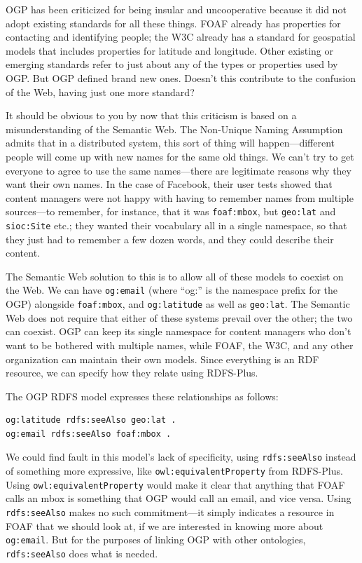 OGP has been criticized for being insular and uncooperative because it
did not adopt existing
standards for all these things. FOAF already has properties for
contacting and identifying people; the W3C already has a standard for
geospatial models that includes properties for latitude and longitude.
Other existing or emerging standards refer to just about any of the
types or properties used by OGP. But OGP defined brand new ones. Doesn't
this contribute to the confusion of the Web, having just one more
standard?

It should be obvious to you by now that this criticism is based on a
misunderstanding of the Semantic Web. The Non-Unique Naming Assumption
admits that in a distributed system, this sort of thing will
happen---different people will come up with new names for the same old
things. We can't try to get everyone to agree to use the same
names---there are legitimate reasons why they want their own names. In
the case of Facebook, their user tests showed that content managers were
not happy with having to remember names from multiple sources---to
remember, for instance, that it was \texttt{foaf:mbox}, but \texttt{geo:lat} and \texttt{sioc:Site}
etc.; they wanted their vocabulary all in a single namespace, so that
they just had to remember a few dozen words, and they could describe
their content.

The Semantic Web solution to this is to allow all of these models to
coexist on the Web. We can have \texttt{og:email} (where ``og:'' is the namespace
prefix for the OGP) alongside \texttt{foaf:mbox}, and \texttt{og:latitude} as well as
\texttt{geo:lat}. The Semantic Web does not require that either of these systems
prevail over the other; the two can coexist. OGP can keep its single
namespace for content managers who don't want to be bothered with
multiple names, while FOAF, the W3C, and any other organization can
maintain their own models. Since everything is an RDF resource, we can
specify how they relate using RDFS-Plus.

The OGP RDFS model expresses these relationships as follows:

\begin{lstlisting}
og:latitude rdfs:seeAlso geo:lat . 
og:email rdfs:seeAlso foaf:mbox .
\end{lstlisting}

We could find fault in this model's lack of specificity, using
\texttt{rdfs:seeAlso} instead of something more expressive, like
\texttt{owl:equivalentProperty} from RDFS-Plus. Using \texttt{owl:equivalentProperty}
would make it clear that anything that FOAF calls an mbox is
something that OGP would call an email, and vice versa. Using
\texttt{rdfs:seeAlso} makes no such commitment---it simply indicates a resource
in FOAF that we should look at, if we are interested in knowing more
about \texttt{og:email}. But for the purposes of linking OGP with other
ontologies, \texttt{rdfs:seeAlso} does what is needed.

